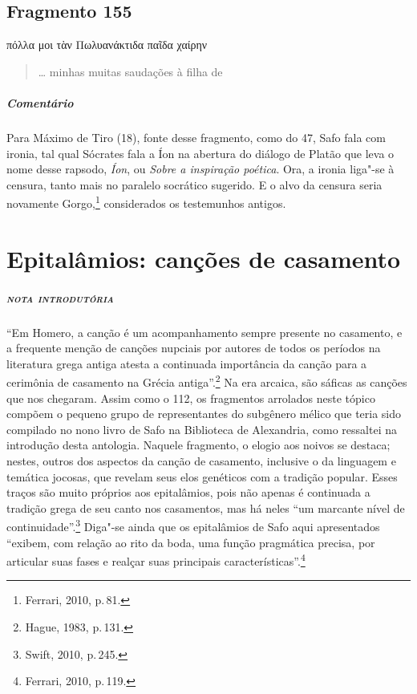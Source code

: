 \section{Fragmento 155}

\begin{gkverse}
πόλλα μοι τὰν Πωλυανάκτιδα παῖδα χαίρην
\end{gkverse}

\begin{verse}
\ldots{} minhas muitas saudações à filha de 
\end{verse}

\medskip

{\paragraph{Comentário} Para Máximo de Tiro (18), fonte desse fragmento, como do 47, Safo fala com ironia, tal qual
Sócrates fala a Íon na abertura do diálogo de Platão que leva o nome desse
rapsodo, \textit{Íon}, ou \textit{Sobre a inspiração poética}. Ora, a ironia
liga"-se à censura, tanto mais no paralelo socrático sugerido.
E o alvo da censura seria novamente Gorgo,\footnote{Ferrari, 2010, p.\,81.} considerados os testemunhos antigos.}



\chapter[Epitalâmios: canções de casamento]{Epitalâmios: canções de casamento}

\paragraph{\textsc{nota introdutória}}
``Em Homero, a canção é um acompanhamento sempre presente no casamento, e a frequente menção de canções nupciais por autores de todos os períodos na literatura grega antiga atesta a continuada importância da canção para a cerimônia de casamento na Grécia antiga''.\footnote{Hague, 1983, p.\,131.} Na era arcaica, são sáficas as canções que nos chegaram. Assim como o 112, os fragmentos arrolados neste tópico compõem o pequeno grupo
de representantes do subgênero mélico que teria sido compilado no nono livro de
Safo na Biblioteca de Alexandria, como ressaltei na introdução desta antologia.
Naquele fragmento, o elogio aos noivos se destaca; nestes, outros dos aspectos
da canção de casamento, inclusive o da linguagem e temática jocosas, que
revelam seus elos genéticos com a tradição popular.
Esses traços são muito próprios aos epitalâmios, pois não apenas é continuada a tradição grega de seu canto nos casamentos, mas há neles  ``um marcante nível de continuidade''.\footnote{Swift, 2010, p.\,245.} Diga"-se ainda que os epitalâmios de Safo aqui apresentados ``exibem, com relação ao rito da boda, uma função pragmática precisa, por articular suas fases e realçar suas principais características''.\footnote{Ferrari, 2010, p.\,119.} 


